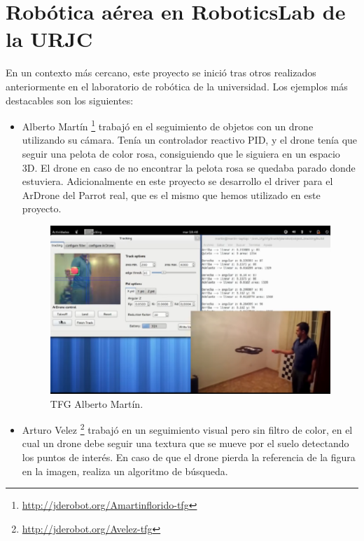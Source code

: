 \section{Robótica aérea en RoboticsLab de la URJC}
En un contexto más cercano, este proyecto se inició tras otros realizados
anteriormente en el laboratorio de robótica de la universidad. Los ejemplos más
destacables son los siguientes:
\begin{itemize}
\item Alberto Martín \footnote{\url{http://jderobot.org/Amartinflorido-tfg}} trabajó en el seguimiento de objetos con un drone
utilizando su cámara. Tenía un controlador reactivo PID, y el drone tenía que seguir una pelota de color rosa, consiguiendo que le siguiera en un espacio 3D. El drone en caso de no encontrar la pelota rosa se quedaba parado donde estuviera. Adicionalmente en este proyecto se desarrollo el driver para el ArDrone del Parrot real, que es el mismo que hemos utilizado en este proyecto.

\begin{figure}[H]
  \centering
  \includegraphics[scale=0.8]{imagenes/AlbertoMartin.png}
  \caption{TFG Alberto Martín.}
  \label{fig:albertoMartin}
\end{figure}


\item Arturo Velez \footnote{\url{http://jderobot.org/Avelez-tfg}} trabajó en un seguimiento visual pero sin filtro de color,
en el cual un drone debe seguir una textura que se mueve por el suelo detectando los puntos de interés. En caso de que el drone pierda la referencia de la figura en la imagen, realiza un algoritmo de búsqueda.


\end{itemize}
